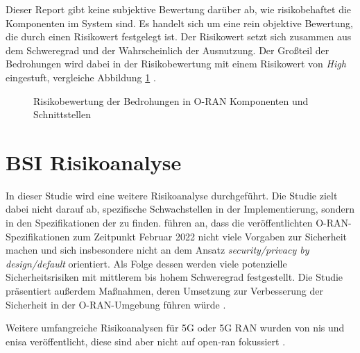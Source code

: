 \par Dieser Report gibt keine subjektive Bewertung darüber ab, wie risikobehaftet die Komponenten im System sind. Es handelt sich um eine rein objektive Bewertung, die durch einen Risikowert festgelegt ist. Der Risikowert setzt sich zusammen aus dem Schweregrad und der Wahrscheinlich der Ausnutzung. Der Großteil der Bedrohungen wird dabei in der Risikobewertung mit einem Risikowert von \textit{High} eingestuft, vergleiche Abbildung \ref{fig:riskscore-oran-components} \autocite{o-ranworkgroup11securityworkgroupORANSecurityThreat2024}.
%
\begin{figure}[H]
    \centering
    \label{fig:riskscore-oran-components}
    \caption{Risikobewertung der Bedrohungen in O-RAN Komponenten und Schnittstellen}
\end{figure}
%

\section{BSI Risikoanalyse}
\label{sec:forschungsstand-bsi}
In dieser Studie wird eine weitere Risikoanalyse durchgeführt. Die Studie zielt dabei nicht darauf ab, spezifische Schwachstellen in der Implementierung, sondern in den Spezifikationen der \orana{} zu finden. \citeauthor{kopsellOpenRANRisikoanalyse2022} führen an, dass die veröffentlichten O-RAN-Spezifikationen zum Zeitpunkt Februar 2022 nicht viele Vorgaben zur Sicherheit machen und sich insbesondere nicht an dem Ansatz \textit{security/privacy by design/default} orientiert. Als Folge dessen werden viele potenzielle Sicherheitsrisiken mit mittlerem bis hohem Schweregrad festgestellt. Die Studie präsentiert außerdem Maßnahmen, deren Umsetzung zur Verbesserung der Sicherheit in der O-RAN-Umgebung führen würde \autocite{kopsellOpenRANRisikoanalyse2022}.
\par Weitere umfangreiche Risikoanalysen für 5G oder 5G RAN wurden von \gls{nis} und \gls{enisa} veröffentlicht, diese sind aber nicht auf \gls{open-ran} fokussiert \autocite{europeanunionagencyfornetworkandinformationsecurity.ENISAThreatLandscape2019,EUCoordinatedRisk2019}. 
%

